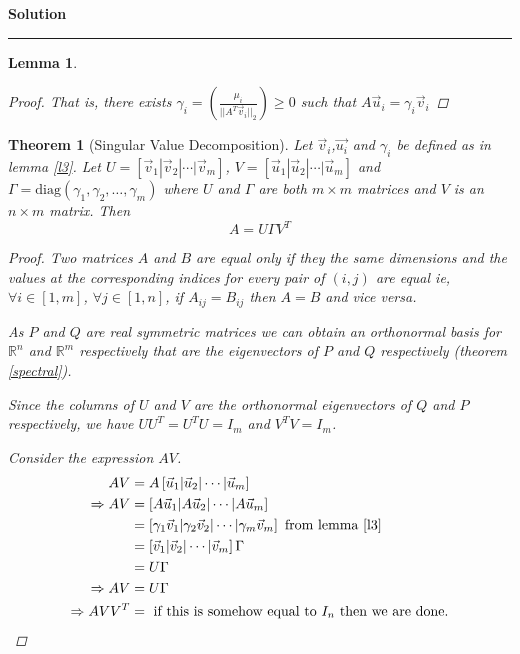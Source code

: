 \documentclass[a4paper,12pt]{article}
\newenvironment{solution}[2][]{%
    \begin{mdframed}[linecolor=blue!70!black, linewidth=2pt, roundcorner=10pt, backgroundcolor=yellow!10!white, skipabove=12pt, skipbelow=12pt]%
        \textbf{\large #2}
        \par\noindent\rule{\textwidth}{0.4pt}
}{
    \end{mdframed}
}
\newtheorem{lemma}{Lemma}
\newtheorem{theorem}{Theorem}
\begin{document}
\begin{solution}{Solution}
\begin{lemma}
\begin{proof}
            That is, there exists 
            $\gamma_{i} = \left(\frac{\mu_{i}}{\lvert\lvert A^{T} \vec{v}_{i} \rvert\rvert_{2}}\right) \geqslant 0$ 
            such that $A\vec{u}_{i} = \gamma_{i} \vec{v}_{i}$
          \end{proof}
        \end{lemma}

        \begin{theorem}[Singular Value Decomposition]
            Let $\vec{v}_{i}$,$\vec{u_{i}}$ and $\gamma_{i}$ be defined as in lemma \@\ref{l3}. 
            Let $U = \left[\vec{v}_{1} | \vec{v}_{2} | \cdots | \vec{v}_{m}\right]$,
            $V = \left[\vec{u}_{1} | \vec{u}_{2} | \cdots | \vec{u}_{m}\right]$ and 
            $\Gamma =\text{diag}(\gamma_{1},\gamma_{2},\dots,\gamma_{m})$ where $U$ and $\Gamma$ are both $m \times m$
            matrices and $V$ is an $n\times m$ matrix. Then \[ A = U \Gamma V^{T} \]
            \begin{proof}
              Two matrices $A$ and $B$ are equal only if they the same dimensions and the values at the corresponding indices
              for every pair of $(i,j)$ are equal ie, $\forall i \in [1,m]$, $\forall j \in [1,n]$, if $A_{ij} = B_{ij}$
              then $A = B$ and vice versa.

              As $P$ and $Q$ are real symmetric matrices we can obtain an orthonormal basis for $\mathbb{R}^{n}$ and 
              $\mathbb{R}^{m}$ respectively that are the eigenvectors of $P$ and $Q$ respectively (theorem \@\ref{spectral}).

              Since the columns of $U$ and $V$ are the orthonormal eigenvectors of $Q$ and $P$ respectively, we have 
              $UU^{T} = U^{T}U = I_{m}$ and $V^{T}V = I_{m}$.
              
              Consider the expression $AV$.
              \begin{align}
                AV &= A \left[ \vec{u}_{1} | \vec{u}_{2} | \cdots | \vec{u}_{m}\right] \nonumber \\
                \Rightarrow AV &= \left[ A\vec{u}_{1} | A\vec{u}_{2} | \cdots | A \vec{u}_{m} \right] \nonumber \\
                               &= \left[ \gamma_{1}\vec{v}_{1} | \gamma_{2}\vec{v}_{2} | \cdots | \gamma_{m} \vec{v}_{m} \right] \text{ from lemma \@\ref{l3}} \nonumber \\
                               &= \left[\vec{v}_{1} | \vec{v}_{2} | \cdots | \vec{v}_{m}\right] \Gamma \nonumber \\
                               &= U \Gamma \nonumber \\
                \Rightarrow AV &= U \Gamma \nonumber \\
                \Rightarrow A V V^{T} &= \text{ if this is somehow equal to $I_{n}$ then we are done.}
              \end{align}
            \end{proof}
        \end{theorem}
  \end{solution}
\end{document}
